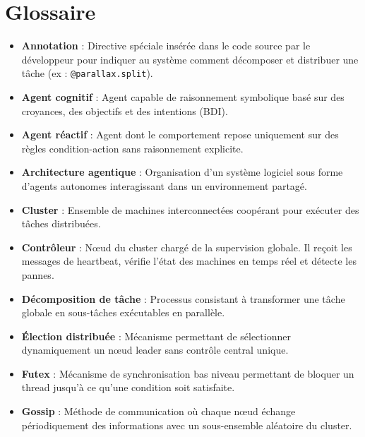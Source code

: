 \documentclass[12pt,a4paper]{report}
\begin{document}
\chapter*{Glossaire}

\begin{itemize}

\item[*] \textbf{Annotation} : Directive spéciale insérée dans le code source par le développeur pour indiquer au système comment décomposer et distribuer une tâche (ex : \texttt{@parallax.split}).

\item[*] \textbf{Agent cognitif} : Agent capable de raisonnement symbolique basé sur des croyances, des objectifs et des intentions (BDI).

\item[*] \textbf{Agent réactif} : Agent dont le comportement repose uniquement sur des règles condition-action sans raisonnement explicite.

\item[*] \textbf{Architecture agentique} : Organisation d’un système logiciel sous forme d’agents autonomes interagissant dans un environnement partagé.

\item[*] \textbf{Cluster} : Ensemble de machines interconnectées coopérant pour exécuter des tâches distribuées.

\item[*] \textbf{Contrôleur} : Nœud du cluster chargé de la supervision globale. Il reçoit les messages de heartbeat, vérifie l’état des machines en temps réel et détecte les pannes.

\item[*] \textbf{Décomposition de tâche} : Processus consistant à transformer une tâche globale en sous-tâches exécutables en parallèle.

\item[*] \textbf{Élection distribuée} : Mécanisme permettant de sélectionner dynamiquement un nœud leader sans contrôle central unique.

\item[*] \textbf{Futex} : Mécanisme de synchronisation bas niveau permettant de bloquer un thread jusqu'à ce qu'une condition soit satisfaite.

\item[*] \textbf{Gossip} : Méthode de communication où chaque nœud échange périodiquement des informations avec un sous-ensemble aléatoire du cluster.


\end{itemize}
\end{document}
